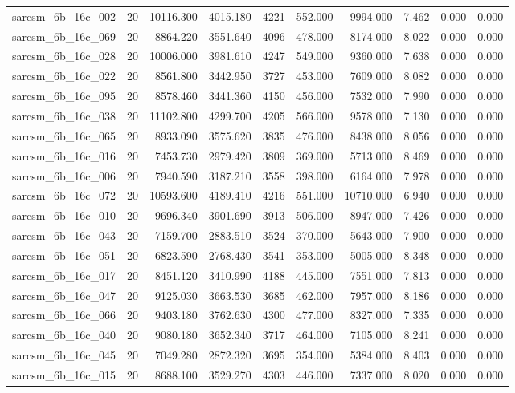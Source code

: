 \begin{tabular}{lrrrrrrrrr}
sarcsm\_6b\_16c\_002 & 20 & 10116.300 & 4015.180 & 4221 & 552.000 & 9994.000 & 7.462 & 0.000 & 0.000 \\
sarcsm\_6b\_16c\_069 & 20 & 8864.220 & 3551.640 & 4096 & 478.000 & 8174.000 & 8.022 & 0.000 & 0.000 \\
sarcsm\_6b\_16c\_028 & 20 & 10006.000 & 3981.610 & 4247 & 549.000 & 9360.000 & 7.638 & 0.000 & 0.000 \\
sarcsm\_6b\_16c\_022 & 20 & 8561.800 & 3442.950 & 3727 & 453.000 & 7609.000 & 8.082 & 0.000 & 0.000 \\
sarcsm\_6b\_16c\_095 & 20 & 8578.460 & 3441.360 & 4150 & 456.000 & 7532.000 & 7.990 & 0.000 & 0.000 \\
sarcsm\_6b\_16c\_038 & 20 & 11102.800 & 4299.700 & 4205 & 566.000 & 9578.000 & 7.130 & 0.000 & 0.000 \\
sarcsm\_6b\_16c\_065 & 20 & 8933.090 & 3575.620 & 3835 & 476.000 & 8438.000 & 8.056 & 0.000 & 0.000 \\
sarcsm\_6b\_16c\_016 & 20 & 7453.730 & 2979.420 & 3809 & 369.000 & 5713.000 & 8.469 & 0.000 & 0.000 \\
sarcsm\_6b\_16c\_006 & 20 & 7940.590 & 3187.210 & 3558 & 398.000 & 6164.000 & 7.978 & 0.000 & 0.000 \\
sarcsm\_6b\_16c\_072 & 20 & 10593.600 & 4189.410 & 4216 & 551.000 & 10710.000 & 6.940 & 0.000 & 0.000 \\
sarcsm\_6b\_16c\_010 & 20 & 9696.340 & 3901.690 & 3913 & 506.000 & 8947.000 & 7.426 & 0.000 & 0.000 \\
sarcsm\_6b\_16c\_043 & 20 & 7159.700 & 2883.510 & 3524 & 370.000 & 5643.000 & 7.900 & 0.000 & 0.000 \\
sarcsm\_6b\_16c\_051 & 20 & 6823.590 & 2768.430 & 3541 & 353.000 & 5005.000 & 8.348 & 0.000 & 0.000 \\
sarcsm\_6b\_16c\_017 & 20 & 8451.120 & 3410.990 & 4188 & 445.000 & 7551.000 & 7.813 & 0.000 & 0.000 \\
sarcsm\_6b\_16c\_047 & 20 & 9125.030 & 3663.530 & 3685 & 462.000 & 7957.000 & 8.186 & 0.000 & 0.000 \\
sarcsm\_6b\_16c\_066 & 20 & 9403.180 & 3762.630 & 4300 & 477.000 & 8327.000 & 7.335 & 0.000 & 0.000 \\
sarcsm\_6b\_16c\_040 & 20 & 9080.180 & 3652.340 & 3717 & 464.000 & 7105.000 & 8.241 & 0.000 & 0.000 \\
sarcsm\_6b\_16c\_045 & 20 & 7049.280 & 2872.320 & 3695 & 354.000 & 5384.000 & 8.403 & 0.000 & 0.000 \\
sarcsm\_6b\_16c\_015 & 20 & 8688.100 & 3529.270 & 4303 & 446.000 & 7337.000 & 8.020 & 0.000 & 0.000 \\

\end{tabular}
